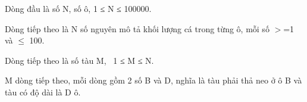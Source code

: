 Dòng đầu là số N, số ô, 1 ≤ N ≤ 100000.

Dòng tiếp theo là N số nguyên mô tả khối lượng cá trong từng ô, mỗi số $>$=1 và  $\le$ 100.

Dòng tiếp theo là số tàu M,  1 ≤ M ≤ N.

M dòng tiếp theo, mỗi dòng gồm 2 số B và D, nghĩa là tàu phải thả neo ở ô B và tàu có độ dài là D ô.
